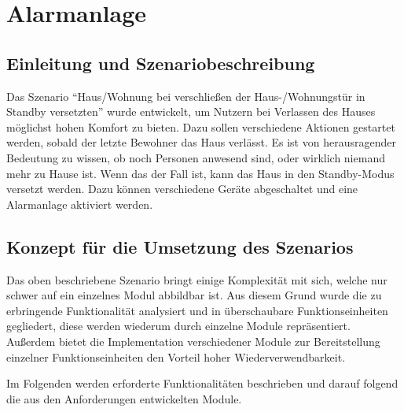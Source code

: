 \section{Alarmanlage}
\subsection{Einleitung und Szenariobeschreibung}
Das Szenario "`Haus/Wohnung bei verschließen der Haus-/Wohnungstür in Standby versetzten"' wurde entwickelt, um Nutzern bei Verlassen des Hauses möglichst hohen Komfort zu bieten. Dazu sollen verschiedene Aktionen gestartet werden, sobald der letzte Bewohner das Haus verlässt. Es ist von herausragender Bedeutung zu wissen, ob noch Personen anwesend sind, oder wirklich niemand mehr zu Hause ist. Wenn das der Fall ist, kann das Haus in den Standby-Modus versetzt werden. Dazu können verschiedene Geräte abgeschaltet und eine Alarmanlage aktiviert werden.

\subsection{Konzept für die Umsetzung des Szenarios}
Das oben beschriebene Szenario bringt einige Komplexität mit sich, welche nur schwer auf ein einzelnes Modul abbildbar ist. Aus diesem Grund wurde die zu erbringende Funktionalität analysiert und in überschaubare Funktionseinheiten gegliedert, diese werden wiederum durch einzelne Module repräsentiert. Außerdem bietet die Implementation verschiedener Module zur Bereitstellung einzelner Funktionseinheiten den Vorteil hoher Wiederverwendbarkeit.

Im Folgenden werden erforderte Funktionalitäten beschrieben und darauf folgend die aus den Anforderungen entwickelten Module.

